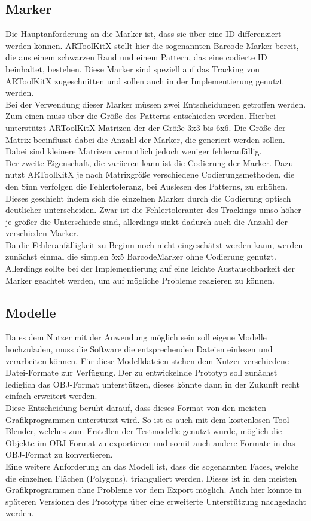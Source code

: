 \subsection{Marker}
Die Hauptanforderung an die Marker ist, dass sie über eine ID differenziert werden können. ARToolKitX stellt hier die sogenannten Barcode-Marker bereit, die aus einem schwarzen Rand und einem Pattern, das eine codierte ID beinhaltet, bestehen. Diese Marker sind speziell auf das Tracking von ARToolKitX zugeschnitten und sollen auch in der Implementierung genutzt werden. \\
Bei der Verwendung dieser Marker müssen zwei Entscheidungen getroffen werden.\\
Zum einen muss über die Größe des Patterns entschieden werden. Hierbei unterstützt ARToolKitX Matrizen der der Größe 3x3 bis 6x6. Die Größe der Matrix beeinflusst dabei die Anzahl der Marker, die generiert werden sollen. Dabei sind kleinere Matrizen vermutlich jedoch weniger fehleranfällig. \\
Der zweite Eigenschaft, die variieren kann ist die Codierung der Marker. Dazu nutzt ARToolKitX je nach Matrixgröße verschiedene Codierungsmethoden, die den Sinn verfolgen die Fehlertoleranz, bei Auslesen des Patterns, zu erhöhen. Dieses geschieht indem sich die einzelnen Marker durch die Codierung optisch deutlicher unterscheiden. Zwar ist die Fehlertoleranter des Trackings umso höher je größer die Unterschiede sind, allerdings sinkt dadurch auch die Anzahl der verschieden Marker.\\
Da die Fehleranfälligkeit zu Beginn noch nicht eingeschätzt werden kann, werden zunächst einmal die simplen 5x5 BarcodeMarker ohne Codierung genutzt. Allerdings sollte bei der Implementierung auf eine leichte Austauschbarkeit der Marker geachtet werden, um auf mögliche Probleme reagieren zu können.

\subsection{Modelle}
Da es dem Nutzer mit der Anwendung möglich sein soll eigene Modelle hochzuladen, muss die Software die entsprechenden Dateien einlesen und verarbeiten können. Für diese Modelldateien stehen dem Nutzer verschiedene Datei-Formate zur Verfügung. Der zu entwickelnde Prototyp soll zunächst lediglich das OBJ-Format unterstützen, dieses könnte dann in der Zukunft recht einfach erweitert werden. \\
Diese Entscheidung beruht darauf, dass dieses Format von den meisten Grafikprogrammen unterstützt wird. So ist es auch mit dem kostenlosen Tool Blender, welches zum Erstellen der Testmodelle genutzt wurde, möglich die Objekte im OBJ-Format zu exportieren und somit auch andere Formate in das OBJ-Format zu konvertieren. \\
Eine weitere Anforderung an das Modell ist, dass die sogenannten Faces, welche die einzelnen Flächen (Polygons), trianguliert werden. Dieses ist in den meisten Grafikprogrammen ohne Probleme vor dem Export möglich. Auch hier könnte in späteren Versionen des Prototyps über eine erweiterte Unterstützung nachgedacht werden.

